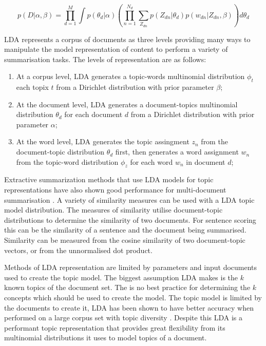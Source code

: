 \begin{equation}
      p(D|\alpha,\beta) = \prod_{d=1}^M \int p(\theta_d|\alpha) (\prod_{n=1}^{N_d} \sum_{Z_{dn}} p(Z_{dn}|\theta_d)p(w_{dn}|Z_{dn}, \beta))d\theta_d
      \label{ldaUpdate}
\end{equation}

LDA represents a corpus of documents as three levels providing many ways to manipulate the model representation of content to perform a variety of summarisation tasks. The levels of representation are as follows:
\begin{enumerate}
      \item At a corpus level, LDA generates a topic-words multinomial distribution $\phi_t$ each topix $t$ from a Dirichlet distribution with prior parameter $\beta$;
      \item At the document level, LDA generates a document-topics multinomial distribution $\theta_d$ for each document $d$ from a Dirichlet distribution with prior parameter $\alpha$;
      \item At the word level, LDA generates the topic assingment $z_n$ from the document-topic distribution $\theta_d$ first, then generates a word assignment $w_n$ from the topic-word distribution $\phi_z$ for each word $w_n$ in document $d$;
\end{enumerate}

Extractive summarization methods that use LDA models for topic representations have also shown good performance for multi-document summarisation \citep{daume2006domain,celikyilmaz2010hybrid}. A variety of similarity measures can be used with a LDA topic model distribution. The measures of similarity utilise document-topic distributions to determine the similarity of two documents. For sentence scoring this can be the similarity of a sentence and the document being summarised. Similarity can be measured from the cosine similarity of two document-topic vectors, or from the unnormalised dot product.

Methods of LDA representation are limited by parameters and input documents used to create the topic model. The biggest assumption LDA makes is the $k$ known topics of the document set. The is no best practice for determining the $k$ concepts which should be used to create the model. The topic model is limited by the documents to create it, LDA has been shown to have better accuracy when performed on a large corpus set with topic diversity \citep{crossley2017important,rajagopal2013commonsense}. Despite this LDA is a performant topic representation that provides great flexibility from its multinomial distributions it uses to model topics of a document.

